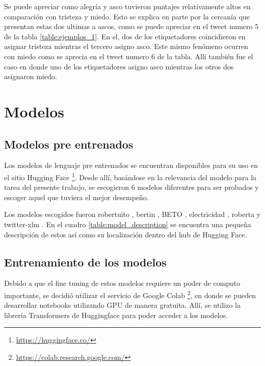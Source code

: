 Se puede apreciar como alegría y asco tuvieron puntajes relativamente altos en comparación con tristeza y miedo. Esto se explica en parte por la cercanía que presentan estas dos ultimas a ascos, como se puede apreciar en el tweet numero 5 de la tabla \ref{table:ejemplos_1}. En el, dos de los etiquetadores coincidieron en asignar tristeza mientras el tercero asigno asco. Este mismo fenómeno ocurren con miedo como se aprecia en el tweet numero 6 de la tabla. Allí también fue el caso en donde uno de los etiquetadores asigno asco  mientras los otros dos asignaron miedo.


\section{Modelos}

\subsection{Modelos pre entrenados}

Los modelos de lenguaje pre entrenados se encuentran disponibles para su uso en el sitio Hugging Face \footnote{\url{https://huggingface.co/}}. Desde allí, basándose en la relevancia del modelo para la tarea del presente trabajo, se escogieron 6 modelos diferentes para ser probados y escoger aquel que tuviera el mejor desempeño.






Los modelos escogidos fueron robertuito \cite{perez-etal-2022-robertuito}, bertin \cite{BERTIN},  BETO \cite{CaneteCFP2020}, electricidad \cite{mromero2020electricidad-base-discriminator},  roberta \cite{ROBERTA} y twitter-xlm \cite{barbieri2022xlm}. En el cuadro \ref{table:model_description} se encuentra una pequeña descripción de estos así como su localización dentro del hub de Hugging Face.




\subsection{Entrenamiento de los modelos}


Debido a que el fine tuning de estos modelos requiere un poder de computo importante, se decidió utilizar el servicio de Google Colab \footnote{\url{https://colab.research.google.com/}}, en donde se pueden desarrollar notebooks utilizando GPU de manera gratuita. Allí, se utilizo la librería Transformers de Huggingface para poder acceder a los modelos. 

